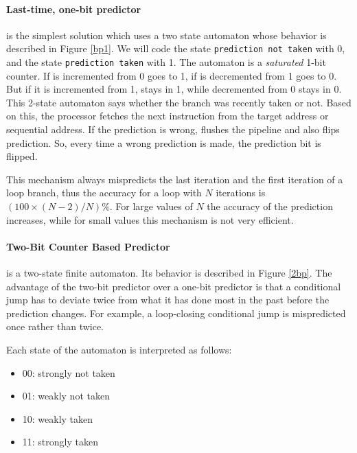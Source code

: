 \paragraph{Last-time, one-bit predictor}
is the simplest solution  which uses a two state automaton whose behavior is described in Figure \ref{bp1}. We will code the state {\tt prediction not taken} with 0, and the state {\tt prediction taken} with 1. The automaton is a {\em saturated} 1-bit counter. If is incremented from 0 goes to 1, if is decremented from 1 goes to 0. But if it is incremented from 1, stays in 1, while decremented from 0 stays in 0. This 2-state automaton says whether the branch was recently taken or not. Based on this, the processor fetches the next instruction from the target address or sequential address. If the prediction is wrong, flushes the pipeline and also flips prediction. So, every time a wrong prediction is made, the prediction bit is flipped.



This mechanism always mispredicts the last iteration and the first iteration of a loop branch, thus the accuracy for a loop with $N$ iterations is $(100 \times (N-2)/N)\%$. For large values of $N$ the accuracy of the prediction increases, while for small values this mechanism is not very efficient.


\paragraph{Two-Bit Counter Based Predictor} is a two-state finite automaton. Its behavior is described in Figure \ref{2bp}. The advantage of the two-bit predictor over a one-bit predictor is that a conditional jump has to deviate twice from what it has done most in the past before the prediction changes. For example, a loop-closing conditional jump is mispredicted once rather than twice.

Each state of the automaton is interpreted as follows:
\begin{itemize}
    \item 00: strongly not taken
    \item 01: weakly not taken
    \item 10: weakly taken
    \item 11: strongly taken
\end{itemize}



